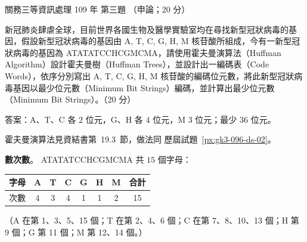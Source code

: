 \begin{pastexam}[label={px:gw3-109-ds-03}]{關務三等資訊處理 109 年 第三題}
（申論；20 分）

新冠肺炎肆虐全球，目前世界各國生物及醫學實驗室均在尋找新型冠狀病毒的基因，假設新型冠狀病毒的基因由 A, T, C, G, H, M 核苷酸所組成，今有一新型冠狀病毒的基因為 ATATATCCHCGMCMA，請使用霍夫曼演算法（Huffman Algorithm）設計霍夫曼樹（Huffman Trees），並設計出一編碼表（Code Words），依序分別寫出 A, T, C, G, H, M 核苷酸的編碼位元數，將此新型冠狀病毒基因以最少位元數（Minimum Bit Strings）編碼，並計算出最少位元數（Minimum Bit Strings）。（20 分）
\end{pastexam}

\begin{pastsoln}
答案：A、T、C 各 $2$ 位元，G、H 各 $4$ 位元，M $3$ 位元；最少 $36$ 位元。

霍夫曼演算法見資結書第~19.3~節，做法同 歷屆試題~\ref{px:gk3-096-ds-02}。

\textbf{數次數}。 ATATATCCHCGMCMA 共 $15$ 個字母：
\begin{center}
\begin{tabular}{l*{6}{c}c}
\toprule
字母 & A & T & C & G & H & M & 合計 \\
\midrule
次數 & 4 & 3 & 4 & 1 & 1 & 2 & 15 \\
\bottomrule
\end{tabular}
\end{center}
（A 在第 1、3、5、15 個；T 在第 2、4、6 個；C 在第 7、8、10、13 個；H 第 9 個；G 第 11 個；M 第 12、14 個。）


\end{pastsoln}
